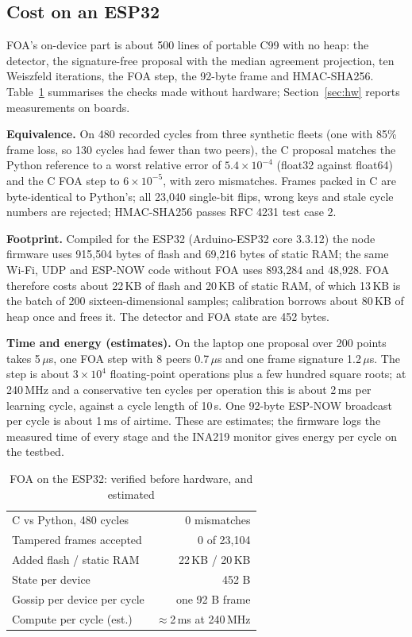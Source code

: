 \subsection{Cost on an ESP32}\label{sec:cost}

FOA's on-device part is about 500 lines of portable C99 with no heap: the detector, the signature-free
proposal with the median agreement projection, ten Weiszfeld iterations, the FOA step, the 92-byte frame
and HMAC-SHA256. Table~\ref{tab:cost} summarises the checks made without hardware; Section~\ref{sec:hw} reports measurements on boards.

\textbf{Equivalence.} On 480 recorded cycles from three synthetic fleets (one with 85\% frame loss, so
130 cycles had fewer than two peers), the C proposal matches the Python reference to a worst relative
error of $5.4\times10^{-4}$ (float32 against float64) and the C FOA step to $6\times10^{-5}$, with zero
mismatches. Frames packed in C are byte-identical to Python's; all 23{,}040 single-bit flips, wrong keys
and stale cycle numbers are rejected; HMAC-SHA256 passes RFC 4231 test case 2.

\textbf{Footprint.} Compiled for the ESP32 (Arduino-ESP32 core 3.3.12) the node firmware uses
915{,}504 bytes of flash and 69{,}216 bytes of static RAM; the same Wi-Fi, UDP and ESP-NOW code without
FOA uses 893{,}284 and 48{,}928. FOA therefore costs about 22\,KB of flash and 20\,KB of static RAM, of
which 13\,KB is the batch of 200 sixteen-dimensional samples; calibration borrows about 80\,KB of heap once and
frees it. The detector and FOA state are 452 bytes.

\textbf{Time and energy (estimates).} On the laptop one proposal over 200 points takes 5\,$\mu$s, one FOA
step with 8 peers 0.7\,$\mu$s and one frame signature 1.2\,$\mu$s. The step is about $3{\times}10^4$
floating-point operations plus a few hundred square roots; at 240\,MHz and a conservative ten cycles per
operation this is about 2\,ms per learning cycle, against a cycle length of 10\,s. One 92-byte ESP-NOW
broadcast per cycle is about 1\,ms of airtime. These are estimates; the firmware logs the measured time
of every stage and the INA219 monitor gives energy per cycle on the testbed.

\begin{table}[t]
\centering
\caption{FOA on the ESP32: verified before hardware, and estimated}
\label{tab:cost}
\small
\begin{tabular}{@{}lr@{}}
\toprule
C vs Python, 480 cycles & 0 mismatches \\
Tampered frames accepted & 0 of 23{,}104 \\
Added flash / static RAM & 22\,KB / 20\,KB \\
State per device & 452 B \\
Gossip per device per cycle & one 92 B frame \\
Compute per cycle (est.) & $\approx$2\,ms at 240\,MHz \\
\bottomrule
\end{tabular}
\end{table}
